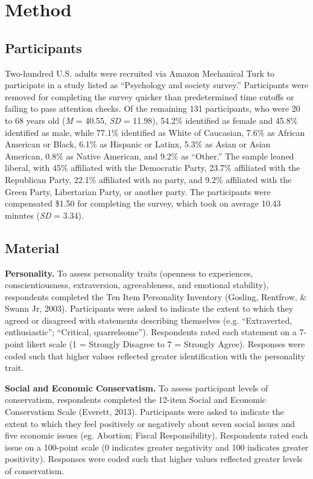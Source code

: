 \documentclass[man]{apa6}
\begin{document}
\hypertarget{method}{%
\section{Method}\label{method}}

\hypertarget{participants}{%
\subsection{Participants}\label{participants}}

Two-hundred U.S. adults were recruited via Amazon Mechanical Turk to participate in a study listed as \enquote{Psychology and society survey.} Participants were removed for completing the survey quicker than predetermined time cutoffs or failing to pass attention checks. Of the remaining 131 participants, who were 20 to 68 years old (\emph{M} = 40.55, \emph{SD} = 11.98), 54.2\% identified as female and 45.8\% identified as male, while 77.1\% identified as White of Caucasian, 7.6\% as African American or Black, 6.1\% as Hispanic or Latinx, 5.3\% as Asian or Asian American, 0.8\% as Native American, and 9.2\% as \enquote{Other.} The sample leaned liberal, with 45\% affiliated with the Democratic Party, 23.7\% affiliated with the Republican Party, 22.1\% affiliated with no party, and 9.2\% affiliated with the Green Party, Libertarian Party, or another party. The participants were compensated \$1.50 for completing the survey, which took on average 10.43 minutes (\emph{SD} = 3.34).

\hypertarget{material}{%
\subsection{Material}\label{material}}

\textbf{Personality.} To assess personality traits (openness to experiences, conscientiousness, extraversion, agreeableness, and emotional stability), respondents completed the Ten Item Personality Inventory (Gosling, Rentfrow, \& Swann Jr, 2003). Participants were asked to indicate the extent to which they agreed or disagreed with statements describing themselves (e.g. \enquote{Extraverted, enthusiastic}; \enquote{Critical, quarrelsome}). Respondents rated each statement on a 7-point likert scale (1 = Strongly Disagree to 7 = Strongly Agree). Responses were coded such that higher values reflected greater identification with the personality trait.

\textbf{Social and Economic Conservatism.} To assess participant levels of conservatism, respondents completed the 12-item Social and Economic Conservatism Scale (Everett, 2013). Participants were asked to indicate the extent to which they feel positively or negatively about seven social issues and five economic issues (eg. Abortion; Fiscal Responsibility). Respondents rated each issue on a 100-point scale (0 indicates greater negativity and 100 indicates greater positivity). Responses were coded such that higher values reflected greater levels of conservatism.
\end{document}
